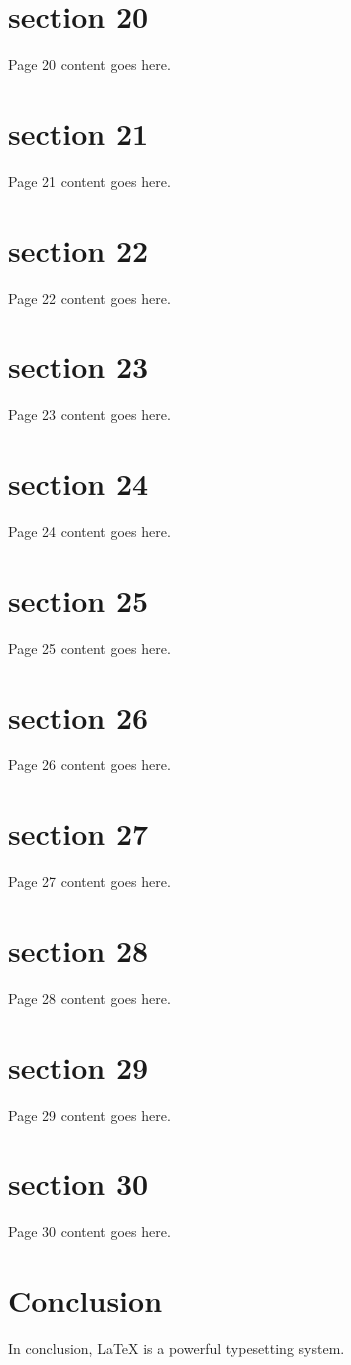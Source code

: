 \documentclass{article}
\begin{document}
\section{section 20}
Page 20 content goes here.
\newpage

\section{section 21}
Page 21 content goes here.
\newpage

\section{section 22}
Page 22 content goes here.
\newpage

\section{section 23}
Page 23 content goes here.
\newpage

\section{section 24}
Page 24 content goes here.
\newpage

\section{section 25}
Page 25 content goes here.
\newpage

\section{section 26}
Page 26 content goes here.
\newpage

\section{section 27}
Page 27 content goes here.
\newpage

\section{section 28}
Page 28 content goes here.
\newpage

\section{section 29}
Page 29 content goes here.
\newpage

\section{section 30}
Page 30 content goes here.
\newpage




\section{Conclusion}
In conclusion, LaTeX is a powerful typesetting system.

\end{document}
